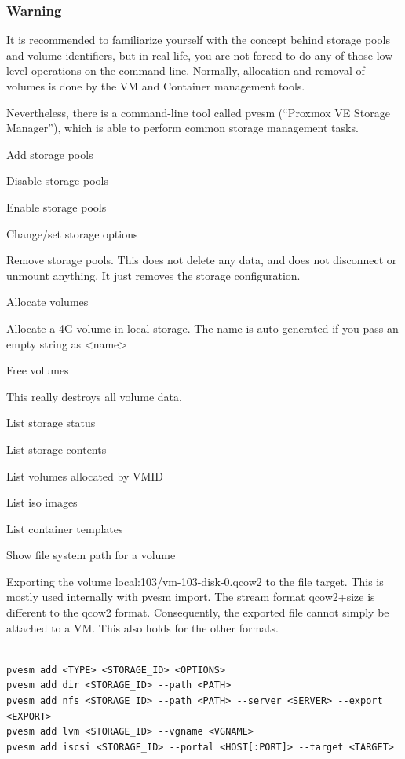 \subsubsection{Warning}

It is recommended to familiarize yourself with the concept behind storage pools and volume identifiers, but in real life, you are not forced to do any of those low level operations on the command line. Normally, allocation and removal of volumes is done by the VM and Container management tools.

Nevertheless, there is a command-line tool called pvesm (“Proxmox VE Storage Manager”), which is able to perform common storage management tasks.

Add storage pools

Disable storage pools

Enable storage pools

Change/set storage options

Remove storage pools. This does not delete any data, and does not disconnect or unmount anything. It just removes the storage configuration.

Allocate volumes

Allocate a 4G volume in local storage. The name is auto-generated if you pass an empty string as <name>

Free volumes

This really destroys all volume data.

List storage status

List storage contents

List volumes allocated by VMID

List iso images

List container templates

Show file system path for a volume

Exporting the volume local:103/vm-103-disk-0.qcow2 to the file target. This is mostly used internally with pvesm import. The stream format qcow2+size is different to the qcow2 format. Consequently, the exported file cannot simply be attached to a VM. This also holds for the other formats.

\begin{lstlisting}

pvesm add <TYPE> <STORAGE_ID> <OPTIONS>
pvesm add dir <STORAGE_ID> --path <PATH>
pvesm add nfs <STORAGE_ID> --path <PATH> --server <SERVER> --export <EXPORT>
pvesm add lvm <STORAGE_ID> --vgname <VGNAME>
pvesm add iscsi <STORAGE_ID> --portal <HOST[:PORT]> --target <TARGET>

\end{lstlisting}

